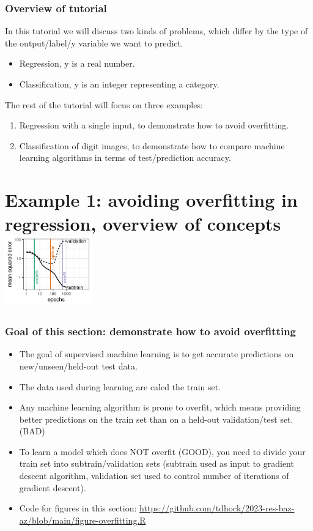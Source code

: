\documentclass{beamer}
\begin{document}
\begin{frame}
  \frametitle{Overview of tutorial}
  In this tutorial we will discuss two kinds of problems, which
  differ by the type of the output/label/y variable we want to predict.
  \begin{itemize}
  \item Regression, y is a real number.
  \item Classification, y is an integer representing a category.
  \end{itemize}

  The rest of the tutorial will focus on three examples:
  \begin{enumerate}
  \item Regression with a single input, to demonstrate how to avoid
    overfitting.
  \item Classification of digit images, to demonstrate how to compare
    machine learning algorithms in terms of test/prediction accuracy.
  \end{enumerate}
\end{frame}

\section{Example 1: avoiding overfitting in regression, overview of concepts
\includegraphics[height=3cm]{figure-overfitting-paper-loss}}   
 
\begin{frame}
  \frametitle{Goal of this section: demonstrate how to avoid
    overfitting}
  \begin{itemize}
  \item The goal of supervised machine learning is to get accurate
    predictions on new/unseen/held-out test data.
  \item The data used during learning are caled the train set.
  \item Any machine learning algorithm is prone to overfit, which
    means providing better predictions on the train set than
    on a held-out validation/test set. (BAD)
  \item To learn a model which does NOT overfit (GOOD), you need to
    divide your train set into subtrain/validation sets (subtrain used
    as input to gradient descent algorithm, validation set used to
    control number of iterations of gradient descent).
  \item Code for figures in this section:
    \url{https://github.com/tdhock/2023-res-baz-az/blob/main/figure-overfitting.R}
  \end{itemize}
\end{frame}
\end{document}
